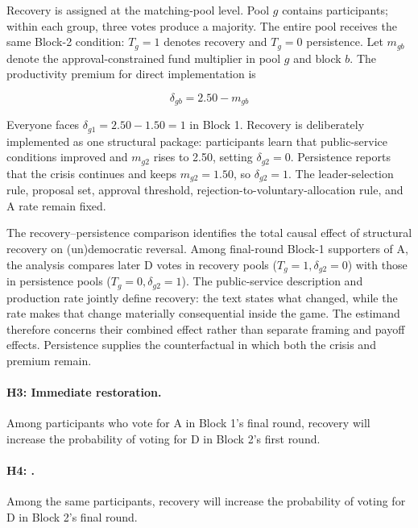 \documentclass[11pt,a4paper]{article}
\newcommand{\Dproc}{\textsf{D}}
\newcommand{\Aproc}{\textsf{A}}
\begin{document}
Recovery is assigned at the matching-pool level. Pool \(g\) contains  participants; within each group, three votes produce a majority. The entire pool receives the same Block-2 condition: \(T_g=1\) denotes recovery and \(T_g=0\) persistence. Let \(m_{gb}\) denote the approval-constrained fund multiplier in pool \(g\) and block \(b\). The productivity premium for direct implementation is

\begin{equation}
\delta_{gb}=2.50-m_{gb}
\label{eq:productivity-premium}
\end{equation}

Everyone faces \(\delta_{g1}=2.50-1.50=1\) in Block 1. Recovery is deliberately implemented as one structural package: participants learn that public-service conditions improved and \(m_{g2}\) rises to 2.50, setting \(\delta_{g2}=0\). Persistence reports that the crisis continues and keeps \(m_{g2}=1.50\), so \(\delta_{g2}=1\). The leader-selection rule, proposal set, approval threshold, rejection-to-voluntary-allocation rule, and \Aproc{} rate remain fixed.

The recovery--persistence comparison identifies the total causal effect of structural recovery on (un)democratic reversal. Among final-round Block-1 supporters of \Aproc{}, the analysis compares later \Dproc{} votes in recovery pools (\(T_g=1,\delta_{g2}=0\)) with those in persistence pools (\(T_g=0,\delta_{g2}=1\)). The public-service description and production rate jointly define recovery: the text states what changed, while the rate makes that change materially consequential inside the game. The estimand therefore concerns their combined effect rather than separate framing and payoff effects. Persistence supplies the counterfactual in which both the crisis and premium remain.



\paragraph{H3: Immediate restoration.} Among participants who vote for \Aproc{} in Block 1's final round, recovery will increase the probability of voting for \Dproc{} in Block 2's first round.

\paragraph{H4: .} Among the same participants, recovery will increase the probability of voting for \Dproc{} in Block 2's final round.
\end{document}
